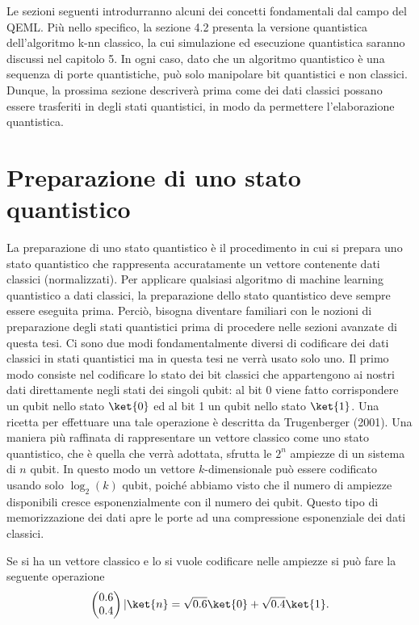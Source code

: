 Le sezioni seguenti introdurranno alcuni dei concetti fondamentali dal campo 
del QEML. Più nello specifico, la sezione 4.2 %
presenta la versione quantistica dell'algoritmo k-nn classico, la cui simulazione
ed esecuzione quantistica saranno discussi nel capitolo 5. 
In ogni caso, dato che un algoritmo quantistico è una sequenza di porte 
quantistiche, può solo manipolare bit quantistici e non classici. 
Dunque, la prossima sezione descriverà prima come dei dati classici possano 
essere trasferiti in degli stati quantistici, in modo da permettere 
l'elaborazione quantistica. 

\section{Preparazione di uno stato quantistico}

La preparazione di uno stato quantistico è il procedimento in cui si prepara 
uno stato quantistico che rappresenta accuratamente un vettore contenente 
dati classici (normalizzati). Per applicare qualsiasi algoritmo di machine 
learning quantistico a dati classici, la preparazione dello stato quantistico 
deve sempre essere eseguita prima. Perciò, bisogna diventare familiari 
con le nozioni di preparazione degli stati quantistici prima di procedere nelle 
sezioni avanzate di questa tesi. Ci sono due modi fondamentalmente diversi 
di codificare dei dati classici in stati quantistici ma in questa tesi ne verrà 
usato solo uno. Il primo modo consiste nel codificare lo stato dei bit classici 
che appartengono ai nostri dati direttamente negli stati dei singoli qubit: 
al bit 0 viene fatto corrispondere un qubit nello stato $\ket{0}$ ed al bit 1 
un qubit nello stato $\ket{1}$. Una ricetta per effettuare una tale operazione 
è descritta da Trugenberger (2001). %
Una maniera più raffinata di rappresentare un vettore classico come uno stato 
quantistico, che è quella che verrà adottata, sfrutta le $2^n$ ampiezze di un 
sistema di $n$ qubit. In questo modo un vettore $k$-dimensionale può essere 
codificato usando solo $\log_2(k)$ qubit, poiché abbiamo visto che il numero 
di ampiezze disponibili cresce esponenzialmente con il numero dei qubit. 
Questo tipo di memorizzazione dei dati apre le porte ad una compressione 
esponenziale dei dati classici. 

Se si ha un vettore classico e lo si vuole codificare nelle ampiezze si può fare 
la seguente operazione 
\begin{equation}
    \begin{pmatrix}
        0.6\\0.4
    \end{pmatrix}
    \arrowvert
    \ket{n} = \sqrt{0.6}\ket{0} + \sqrt{0.4}\ket{1}.
\end{equation}

